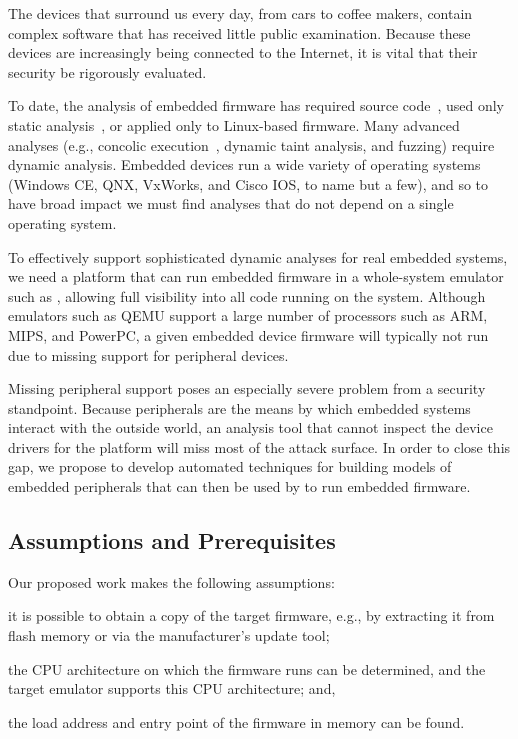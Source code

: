 The devices that surround us every day, from cars to coffee makers,
contain complex software that has received little public examination.
Because these devices are increasingly being connected to the Internet,
it is vital that their security be rigorously evaluated.

To date, the analysis of embedded firmware has required source
code~\cite{davidson:2013:fie}, used only static
analysis~\cite{dreissen:2012:satphone}, or applied only to Linux-based
firmware. Many advanced analyses (e.g., concolic
execution~\cite{godefroid:2005:dart}, dynamic taint analysis, and
fuzzing) require dynamic analysis. Embedded devices run a wide variety
of operating systems (Windows CE, QNX, VxWorks, and Cisco IOS, to name
but a few), and so to have broad impact we must find analyses that do
not depend on a single operating system.

To effectively support sophisticated dynamic analyses for real embedded
systems, we need a platform that can run embedded firmware in a
whole-system emulator such as \dynamicsys, allowing full visibility
into all code running on the system. Although emulators such as QEMU
support a large number of processors such as ARM, MIPS, and PowerPC, a
given embedded device firmware will typically not run due to missing
support for peripheral devices.

Missing peripheral support poses an especially severe problem from a security
standpoint. Because peripherals are the means by which embedded systems
interact with the outside world, an analysis tool that cannot inspect the
device drivers for the platform will miss most of the attack surface. In order
to close this gap, we propose to develop automated techniques for building
models of embedded peripherals that can then be used by \dynamicsys to run
embedded firmware.

\subsection{Assumptions and Prerequisites}

Our proposed work makes the following assumptions:%
\begin{inparaenum}
    \item it is possible to obtain a copy of the target firmware, e.g.,
    by extracting it from flash memory or via the manufacturer's update
    tool;
    \item the CPU architecture on which the firmware runs can be
    determined, and the target emulator supports this CPU architecture;
    and,
    \item the load address and entry point of the firmware in memory can
    be found.
\end{inparaenum}

